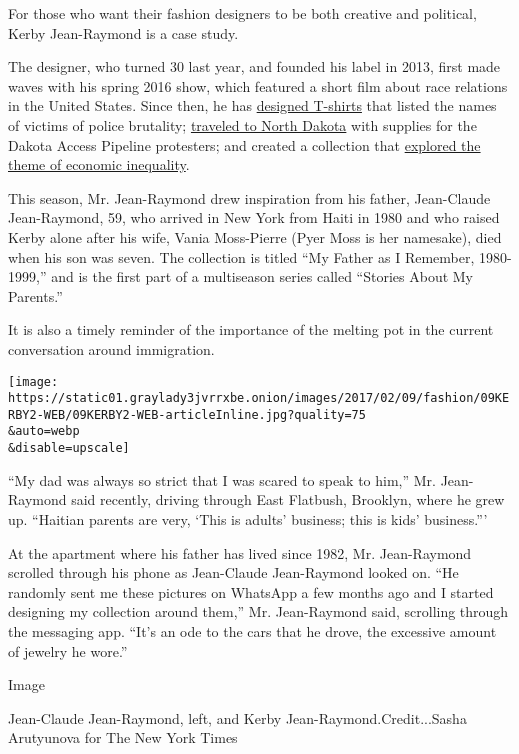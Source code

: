 For those who want their fashion designers to be both creative and
political, Kerby Jean-Raymond is a case study.

The designer, who turned 30 last year, and founded his label in 2013,
first made waves with his spring 2016 show, which featured a short film
about race relations in the United States. Since then, he has
\href{https://www.nytimes3xbfgragh.onion/2015/01/22/fashion/after-a-tragedy-like-the-charlie-hebdo-shooting-come-the-products.html}{designed
T-shirts} that listed the names of victims of police brutality;
\href{https://www.nytimes3xbfgragh.onion/2016/02/18/fashion/erykah-badu-debut-new-york-fashion-week.html}{traveled
to North Dakota} with supplies for the Dakota Access Pipeline
protesters; and created a collection that
\href{https://www.nytimes3xbfgragh.onion/2016/09/13/fashion/new-york-fashion-week-hood-by-air-altuzarra.html}{explored
the theme of economic inequality}.

This season, Mr. Jean-Raymond drew inspiration from his father,
Jean-Claude Jean-Raymond, 59, who arrived in New York from Haiti in 1980
and who raised Kerby alone after his wife, Vania Moss-Pierre (Pyer Moss
is her namesake), died when his son was seven. The collection is titled
``My Father as I Remember, 1980-1999,'' and is the first part of a
multiseason series called ``Stories About My Parents.''

It is also a timely reminder of the importance of the melting pot in the
current conversation around immigration.

\texttt{[image: https://static01.graylady3jvrrxbe.onion/images/2017/02/09/fashion/09KERBY2-WEB/09KERBY2-WEB-articleInline.jpg?quality=75\\\&auto=webp\\\&disable=upscale]}

``My dad was always so strict that I was scared to speak to him,'' Mr.
Jean-Raymond said recently, driving through East Flatbush, Brooklyn,
where he grew up. ``Haitian parents are very, `This is adults' business;
this is kids' business.'''

At the apartment where his father has lived since 1982, Mr. Jean-Raymond
scrolled through his phone as Jean-Claude Jean-Raymond looked on. ``He
randomly sent me these pictures on WhatsApp a few months ago and I
started designing my collection around them,'' Mr. Jean-Raymond said,
scrolling through the messaging app. ``It's an ode to the cars that he
drove, the excessive amount of jewelry he wore.''

Image

Jean-Claude Jean-Raymond, left, and Kerby Jean-Raymond.Credit...Sasha
Arutyunova for The New York Times

